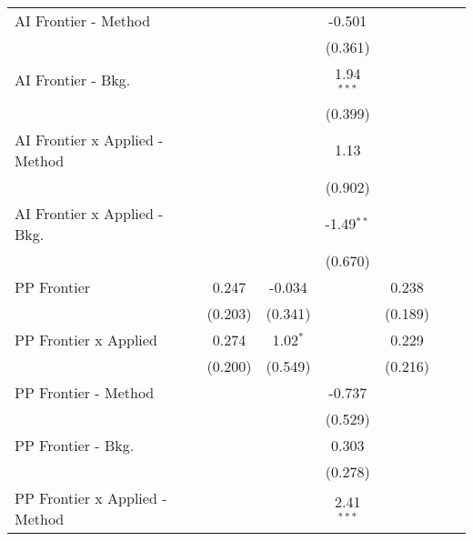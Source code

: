 \begin{tabular}{lcccccc}
   AI Frontier - Method           &               &              & -0.501        &               &        &   \\   
                                  &               &              & (0.361)       &               &        &   \\   
   AI Frontier - Bkg.             &               &              & 1.94$^{***}$  &               &        &   \\   
                                  &               &              & (0.399)       &               &        &   \\   
   AI Frontier x Applied - Method &               &              & 1.13          &               &        &   \\   
                                  &               &              & (0.902)       &               &        &   \\   
   AI Frontier x Applied - Bkg.   &               &              & -1.49$^{**}$  &               &        &   \\   
                                  &               &              & (0.670)       &               &        &   \\   
   PP Frontier                    & 0.247         & -0.034       &               & 0.238         &        &   \\   
                                  & (0.203)       & (0.341)      &               & (0.189)       &        &   \\   
   PP Frontier x Applied          & 0.274         & 1.02$^{*}$   &               & 0.229         &        &   \\   
                                  & (0.200)       & (0.549)      &               & (0.216)       &        &   \\   
   PP Frontier - Method           &               &              & -0.737        &               &        &   \\   
                                  &               &              & (0.529)       &               &        &   \\   
   PP Frontier - Bkg.             &               &              & 0.303         &               &        &   \\   
                                  &               &              & (0.278)       &               &        &   \\   
   PP Frontier x Applied - Method &               &              & 2.41$^{***}$  &               &        &   \\   

\end{tabular}
